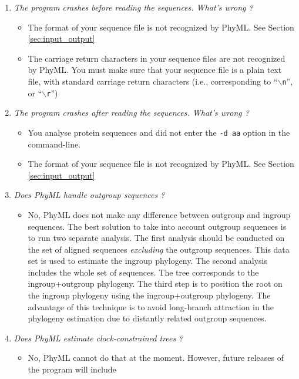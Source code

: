\documentclass[a4paper,12pt]{article}
\newcommand{\x}[1]{\texttt{#1}}
\begin{document}
\begin{enumerate}
\item {\it The program crashes before reading the sequences. What's wrong ?}\\
\begin{itemize}
\item The format of your sequence file is not recognized by PhyML. See Section \ref{sec:input_output}
\item The carriage return characters in your sequence files are not recognized by PhyML. You must
  make sure that your sequence file is a plain text file, with standard carriage return characters (i.e.,
  corresponding to ``$\backslash$\x{n}'', or ``$\backslash$\x{r}'')
\end{itemize}
\item {\it The program crashes after reading the sequences. What's wrong ?}\\
\begin{itemize}
\item You analyse protein sequences and did not enter the \x{-d aa} option in the command-line.
\item The format of your sequence file is not recognized by PhyML. See Section \ref{sec:input_output}
\end{itemize}
\item {\it Does PhyML handle outgroup sequences ?}\\
\begin{itemize}
\item No,  PhyML does  not make  any difference between  outgroup and  ingroup sequences.   The best
solution to take into account outgroup sequences is to run two separate analysis. The first analysis
should be  conducted on the set  of aligned sequences  {\it excluding} the outgroup  sequences. This
data set is  used to estimate the ingroup  phylogeny. The second analysis includes the  whole set of
sequences. The tree corresponds to the ingroup+outgroup phylogeny. The third step is to position the
root on the ingroup phylogeny using  the ingroup+outgroup phylogeny. The advantage of this technique
is to  avoid long-branch attraction  in the phylogeny  estimation due to distantly  related outgroup
sequences.
\end{itemize}
\item {\it Does PhyML estimate clock-constrained trees ?}\\
\begin{itemize}
\item No, PhyML cannot  do that at the moment. However, future releases  of the program will include

\end{itemize}
\end{enumerate}
\end{document}
